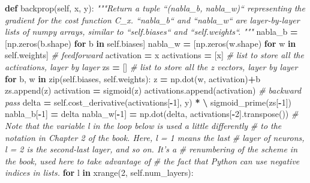 \documentclass[]{book}
\newenvironment{Shaded}{\begin{snugshade}}{\end{snugshade}}
\newcommand{\KeywordTok}[1]{\textcolor[rgb]{0.13,0.29,0.53}{\textbf{{#1}}}}
\newcommand{\DecValTok}[1]{\textcolor[rgb]{0.00,0.00,0.81}{{#1}}}
\newcommand{\CommentTok}[1]{\textcolor[rgb]{0.56,0.35,0.01}{\textit{{#1}}}}
\newcommand{\VariableTok}[1]{\textcolor[rgb]{0.00,0.00,0.00}{{#1}}}
\newcommand{\ControlFlowTok}[1]{\textcolor[rgb]{0.13,0.29,0.53}{\textbf{{#1}}}}
\newcommand{\OperatorTok}[1]{\textcolor[rgb]{0.81,0.36,0.00}{\textbf{{#1}}}}
\newcommand{\BuiltInTok}[1]{{#1}}
\newcommand{\NormalTok}[1]{{#1}}
\begin{document}
\begin{Shaded}
\begin{Highlighting}[]
    \KeywordTok{def} \NormalTok{backprop(}\VariableTok{self}\NormalTok{, x, y):}
        \CommentTok{"""Return a tuple ``(nabla_b, nabla_w)`` representing the gradient for }
\CommentTok{        the cost function C_x.  ``nabla_b`` and ``nabla_w`` are layer-by-layer }
\CommentTok{        lists of numpy arrays, similar to ``self.biases`` and ``self.weights``.}
\CommentTok{        """}
        \NormalTok{nabla_b }\OperatorTok{=} \NormalTok{[np.zeros(b.shape) }\ControlFlowTok{for} \NormalTok{b }\OperatorTok{in} \VariableTok{self}\NormalTok{.biases]}
        \NormalTok{nabla_w }\OperatorTok{=} \NormalTok{[np.zeros(w.shape) }\ControlFlowTok{for} \NormalTok{w }\OperatorTok{in} \VariableTok{self}\NormalTok{.weights]}
        \CommentTok{# feedforward}
        \NormalTok{activation }\OperatorTok{=} \NormalTok{x}
        \NormalTok{activations }\OperatorTok{=} \NormalTok{[x] }\CommentTok{# list to store all the activations, layer by layer}
        \NormalTok{zs }\OperatorTok{=} \NormalTok{[] }\CommentTok{# list to store all the z vectors, layer by layer}
        \ControlFlowTok{for} \NormalTok{b, w }\OperatorTok{in} \BuiltInTok{zip}\NormalTok{(}\VariableTok{self}\NormalTok{.biases, }\VariableTok{self}\NormalTok{.weights):}
            \NormalTok{z }\OperatorTok{=} \NormalTok{np.dot(w, activation)}\OperatorTok{+}\NormalTok{b}
            \NormalTok{zs.append(z)}
            \NormalTok{activation }\OperatorTok{=} \NormalTok{sigmoid(z)}
            \NormalTok{activations.append(activation)}
        \CommentTok{# backward pass}
        \NormalTok{delta }\OperatorTok{=} \VariableTok{self}\NormalTok{.cost_derivative(activations[}\OperatorTok{-}\DecValTok{1}\NormalTok{], y) }\OperatorTok{*} \OperatorTok{\textbackslash{}}
            \NormalTok{sigmoid_prime(zs[}\OperatorTok{-}\DecValTok{1}\NormalTok{])}
        \NormalTok{nabla_b[}\OperatorTok{-}\DecValTok{1}\NormalTok{] }\OperatorTok{=} \NormalTok{delta}
        \NormalTok{nabla_w[}\OperatorTok{-}\DecValTok{1}\NormalTok{] }\OperatorTok{=} \NormalTok{np.dot(delta, activations[}\OperatorTok{-}\DecValTok{2}\NormalTok{].transpose())}
        \CommentTok{# Note that the variable l in the loop below is used a little differently }
        \CommentTok{# to the notation in Chapter 2 of the book.  Here, l = 1 means the last }
        \CommentTok{# layer of neurons, l = 2 is the second-last layer, and so on.  It's a }
        \CommentTok{# renumbering of the scheme in the book, used here to take advantage of }
        \CommentTok{# the fact that Python can use negative indices in lists.}
        \ControlFlowTok{for} \NormalTok{l }\OperatorTok{in} \BuiltInTok{xrange}\NormalTok{(}\DecValTok{2}\NormalTok{, }\VariableTok{self}\NormalTok{.num_layers):}

\end{Highlighting}
\end{Shaded}
\end{document}
